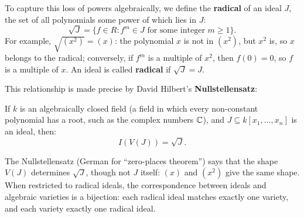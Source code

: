 To capture this loss of powers algebraically, we define the \textbf{radical} of an ideal $J$, the set of all polynomials some power of which lies in $J$:
\[
\sqrt{J} = \{f \in R : f^m \in J \text{ for some integer } m \ge 1\}.
\]
For example, $\sqrt{(x^2)} = (x)$: the polynomial $x$ is not in $(x^2)$, but $x^2$ is, so $x$ belongs to the radical; conversely, if $f^m$ is a multiple of $x^2$, then $f(0) = 0$, so $f$ is a multiple of $x$. An ideal is called \textbf{radical} if $\sqrt{J} = J$.

This relationship is made precise by David Hilbert's \textbf{Nullstellensatz}:
\begin{theorem}
If $k$ is an algebraically closed field (a field in which every non-constant polynomial has a root, such as the complex numbers $\mathbb{C}$), and $J \subseteq k[x_1, \dots, x_n]$ is an ideal, then:
\[
I(V(J)) = \sqrt{J}.
\]
\end{theorem}
The Nullstellensatz (German for ``zero-places theorem'') says that the shape $V(J)$ determines $\sqrt{J}$, though not $J$ itself: $(x)$ and $(x^2)$ give the same shape. When restricted to radical ideals, the correspondence between ideals and algebraic varieties is a bijection: each radical ideal matches exactly one variety, and each variety exactly one radical ideal.

